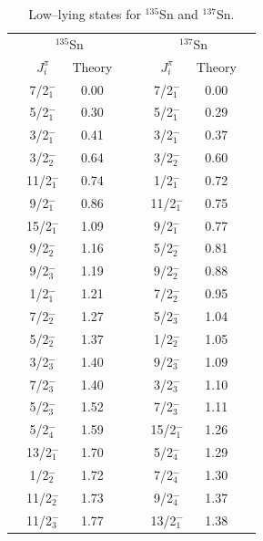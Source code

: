 \documentclass{article}
\begin{document}
\begin{table}[htbp]
\caption{Low--lying states for  $^{135}$Sn and $^{137}$Sn.}
\label{tab:odd_isotopes}
\begin{center}
\begin{tabular}{|cccc|cccc|}
\hline
\multicolumn{4}{|c|}{ $^{135}$Sn} & \multicolumn{4}{|c|}{ $^{137}$Sn}\\
&{$J^{\pi}_i$}&  Theory&&    &{$J^{\pi}_i$}&   Theory& \\

\hline

&  7/2$_1^-$  &  0.00  &&    &  7/2$_1^-$  &   0.00&    \\
&  5/2$_1^-$  &  0.30  &&    &  5/2$_1^-$  &   0.29&    \\
&  3/2$_1^-$  &  0.41  &&    &  3/2$_1^-$  &   0.37&    \\
&  3/2$_2^-$  &  0.64  &&    &  3/2$_2^-$  &   0.60&    \\
& 11/2$_1^-$  &  0.74  &&    &  1/2$_1^-$  &   0.72&    \\
&  9/2$_1^-$  &  0.86  &&    & 11/2$_1^-$  &   0.75&    \\
& 15/2$_1^-$  &  1.09  &&    &  9/2$_1^-$  &   0.77&    \\
&  9/2$_2^-$  &  1.16  &&    &  5/2$_2^-$  &   0.81&    \\
&  9/2$_3^-$  &  1.19  &&    &  9/2$_2^-$  &   0.88&    \\
&  1/2$_1^-$  &  1.21  &&    &  7/2$_2^-$  &   0.95&    \\
&  7/2$_2^-$  &  1.27  &&    &  5/2$_3^-$  &   1.04&    \\
&  5/2$_2^-$  &  1.37  &&    &  1/2$_2^-$  &   1.05&    \\
&  3/2$_3^-$  &  1.40  &&    &  9/2$_3^-$  &   1.09&    \\
&  7/2$_3^-$  &  1.40  &&    &  3/2$_3^-$  &   1.10&    \\
&  5/2$_3^-$  &  1.52  &&    &  7/2$_3^-$  &   1.11&    \\
&  5/2$_4^-$  &  1.59  &&    & 15/2$_1^-$  &   1.26&    \\
& 13/2$_1^-$  &  1.70  &&    &  5/2$_4^-$  &   1.29&    \\
&  1/2$_2^-$  &  1.72  &&    &  7/2$_4^-$  &   1.30&    \\
& 11/2$_2^-$  &  1.73  &&    &  9/2$_4^-$  &   1.37&    \\
& 11/2$_3^-$  &  1.77  &&    & 13/2$_1^-$  &   1.38&    \\

\hline
\end{tabular}
\end{center}
\end{table}
\end{document}
